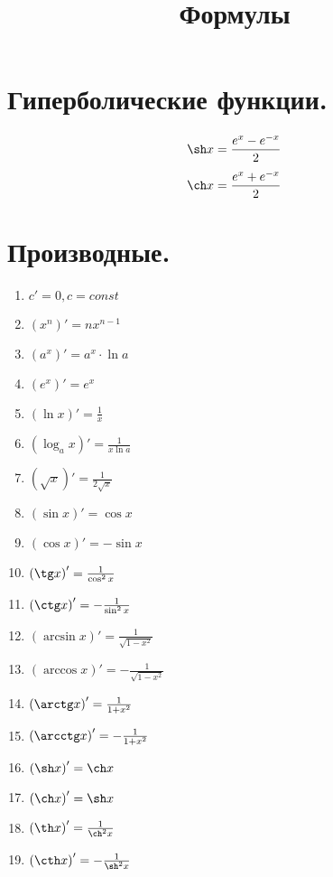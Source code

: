 \documentclass[a4paper,14pt]{article}
\title{Формулы}
\date{}
\begin{document}
    \maketitle
    \section{Гиперболические функции.}
    \[\sh x=\frac{e^x-e^{-x}}{2}\]
    \[\ch x=\frac{e^x+e^{-x}}{2}\]
    \section{Производные.}
    \begin{multicols}{2}
        \begin{enumerate}
            \item $c'=0, c=const$
            \item $\left(x^n\right)'=nx^{n-1}$
            \item $\left(a^x\right)'=a^x\cdot \ln a$
            \item $\left(e^x\right)'=e^x$
            \item $\left(\ln x\right)'=\frac 1x$
            \item $\left(\log_a x\right)'=\frac{1}{x \ln a}$
            \item $\left(\sqrt x\right)'=\frac{1}{2\sqrt x}$
            \item $\left(\sin x\right)'=\cos x$
            \item $\left(\cos x\right)'=-\sin x$
            \item $\left(\tg x\right)'=\frac{1}{\cos^2x}$
            \item $\left(\ctg x\right)'=-\frac{1}{\sin^2 x}$
            \item $\left(\arcsin x\right)'=\frac{1}{\sqrt{1-x^2}}$
            \item $\left(\arccos x\right)'=-\frac{1}{\sqrt{1-x^2}}$
            \item $\left(\arctg x\right)'=\frac{1}{1+x^2}$
            \item $\left(\arcctg x\right)'=-\frac{1}{1+x^2}$
            \item $\left(\sh x\right)'=\ch x$
            \item $\left(\ch x\right)'=\sh x$
            \item $\left(\th x\right)'=\frac{1}{\ch^2x}$
            \item $\left(\cth x\right)'=-\frac{1}{\sh^2x}$
        \end{enumerate}
    \end{multicols}
\end{document}
